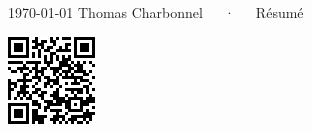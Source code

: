 \documentclass[11pt, a4paper]{awesome-cv}
\begin{document}
\vspace{2cm}
\makecvheader[C]

\makecvfooter
  {\today}
  {Thomas Charbonnel~~~·~~~Résumé}
  {\thepage}


\vspace{1cm}

\begin{minipage}[t]{.62\textwidth}
  
  
  
\end{minipage}\hfill\vline\hfill%
\begin{minipage}[t]{.34\textwidth}
  
  
  \vspace{5cm}
  \begin{center}
    \includegraphics{qrcode}
  \end{center}
\end{minipage}

\end{document}
